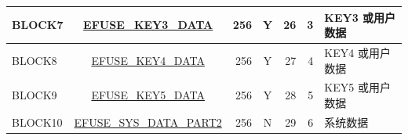 \begin{longtable}[l]{ |l|c|r|c|r|r|l| }
    \hline
    BLOCK7 & \hyperref[fielddesc:EFUSEKEY3DATA0]{EFUSE\_KEY3\_DATA} & 256 & Y & 26 & 3 & KEY3 或用户数据 \\
    \hline
    BLOCK8 & \hyperref[fielddesc:EFUSEKEY4DATA0]{EFUSE\_KEY4\_DATA} & 256 & Y & 27 & 4 & KEY4 或用户数据 \\
    \hline
    BLOCK9 & \hyperref[fielddesc:EFUSEKEY5DATA0]{EFUSE\_KEY5\_DATA} & 256 & Y & 28 & 5 & KEY5 或用户数据 \\
    \hline
    BLOCK10 & \hyperref[fielddesc:EFUSESYSDATAPART20]{EFUSE\_SYS\_DATA\_PART2} & 256 & N & 29 & 6 & 系统数据 \\
    \hline
\end{longtable}
